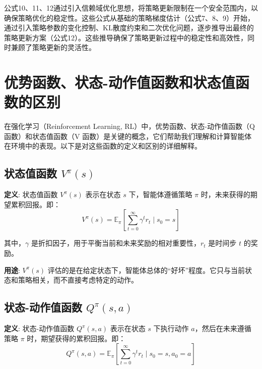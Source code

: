 \documentclass[twocolumn, 10pt]{article} %
\theoremstyle{remark}
\begin{document}
公式10、11、12通过引入信赖域优化思想，将策略更新限制在一个安全范围内，以确保策略优化的稳定性。这些公式从基础的策略梯度估计（公式7、8、9）开始，通过引入策略参数的变化控制、KL散度约束和二次优化问题，逐步推导出最终的策略更新方案（公式12）。这些推导确保了策略更新过程中的稳定性和高效性，同时兼顾了策略更新的灵活性。





















\appendix

\section{优势函数、状态-动作值函数和状态值函数的区别}

在强化学习（Reinforcement Learning, RL）中，优势函数、状态-动作值函数（Q 函数）和状态值函数（V 函数）是关键的概念，它们帮助我们理解和计算智能体在环境中的表现。以下是对这些函数的定义和区别的详细解释。

\subsection{状态值函数 \( V^\pi(s) \)}

\textbf{定义}:
状态值函数 \( V^\pi(s) \) 表示在状态 \( s \) 下，智能体遵循策略 \( \pi \) 时，未来获得的期望累积回报。即：
\[
V^\pi(s) = \mathbb{E}_\pi \left[ \sum_{t=0}^{\infty} \gamma^t r_{t} \mid s_0 = s \right]
\]

其中，\( \gamma \) 是折扣因子，用于平衡当前和未来奖励的相对重要性，\( r_t \) 是时间步 \( t \) 的奖励。

\textbf{用途}:
\( V^\pi(s) \) 评估的是在给定状态下，智能体总体的“好坏”程度。它只与当前状态和策略相关，而不直接考虑特定的动作。

\subsection{状态-动作值函数 \( Q^\pi(s, a) \)}

\textbf{定义}:
状态-动作值函数 \( Q^\pi(s, a) \) 表示在状态 \( s \) 下执行动作 \( a \)，然后在未来遵循策略 \( \pi \) 时，期望获得的累积回报。即：
\[
Q^\pi(s, a) = \mathbb{E}_\pi \left[ \sum_{t=0}^{\infty} \gamma^t r_{t} \mid s_0 = s, a_0 = a \right]
\]
\end{document}
